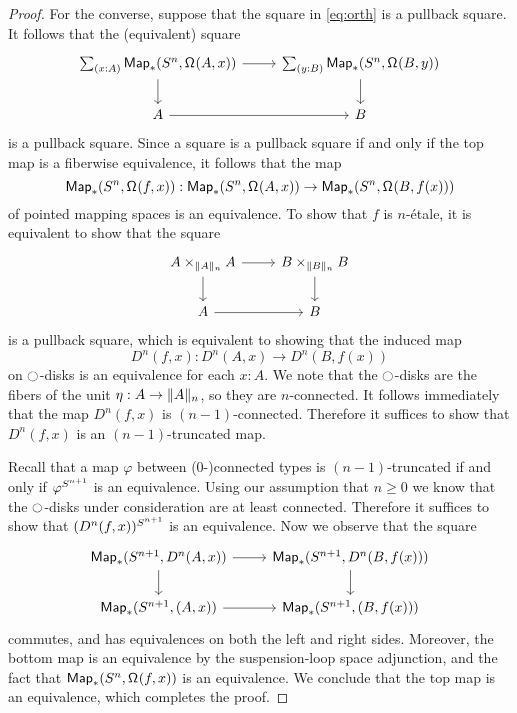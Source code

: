 \documentclass[9pt,twosided]{amsart}
\begin{document}
\begin{proof}
  For the converse, suppose that the square in \cref{eq:orth} is a pullback square. It follows that the (equivalent) square
  \begin{equation*}
    \begin{tikzcd}
      \sm{x:A}\mathsf{Map}_\ast(\sphere{n},\loopspace{A,x}) \arrow[r] \arrow[d] & \sm{y:B} \mathsf{Map}_\ast(\sphere{n},\loopspace{B,y}) \arrow[d] \\
      A \arrow[r] & B
    \end{tikzcd}
  \end{equation*}
is a pullback square.
  Since a square is a pullback square if and only if the top map is a fiberwise equivalence, it follows that the map
  \begin{equation*}
    \mathsf{Map}_\ast(S^{n},\mathsf{\Omega}^{}(f,x)):\mathsf{Map}_\ast(S^{n},\mathsf{\Omega}^{}(A,x)) \to \mathsf{Map}_\ast(S^{n},\mathsf{\Omega}^{}(B,f(x)))
  \end{equation*}
  of pointed mapping spaces is an equivalence. To show that $f$ is $n$-\'etale, it is equivalent to show that the square
  \begin{equation*}
    \begin{tikzcd}
      A\times_{\trunc{n}{A}} A \arrow[r] \arrow[d] & B \times_{\trunc{n}{B}} B \arrow[d] \\
      A \arrow[r] & B
    \end{tikzcd}
  \end{equation*}
  is a pullback square, which is equivalent to showing that the induced map
  \begin{equation*}
    D^{n}(f,x):D^{n}(A,x)\to D^{n}(B,f(x))
  \end{equation*}
  on ${\ocircle}$-disks is an equivalence for each $x:A$. We note that the ${\ocircle}$-disks are the fibers of the unit $\eta:A \to \trunc{n}{A}$, so they are $n$-connected. It follows immediately that the map $D^{n}(f,x)$ is $(n-1)$-connected. Therefore it suffices to show that $D^{n}(f,x)$ is an $(n-1)$-truncated map.

  Recall that a map $\varphi$ between ($0$-)connected types is $(n-1)$-truncated if and only if $\varphi^{S^{n+1}}$ is an equivalence. Using our assumption that $n\geq 0$ we know that the ${\ocircle}$-disks under consideration are at least connected. Therefore it suffices to show that $(D^{n}(f,x))^{S^{n+1}}$ is an equivalence. Now we observe that the square
  \begin{equation*}
    \begin{tikzcd}
      \mathsf{Map}_\ast(\sphere{n+1},D^{n}(A,x)) \arrow[r] \arrow[d] & \mathsf{Map}_\ast(\sphere{n+1},D^{n}(B,f(x))) \arrow[d] \\
      \mathsf{Map}_\ast(\sphere{n+1},(A,x)) \arrow[r] & \mathsf{Map}_\ast(\sphere{n+1},(B,f(x)))
    \end{tikzcd}
  \end{equation*}
  commutes, and has equivalences on both the left and right sides. Moreover, the bottom map is an equivalence by the suspension-loop space adjunction, and the fact that $\mathsf{Map}_\ast(S^{n},\mathsf{\Omega}^{}(f,x))$ is an equivalence. We conclude that the top map is an equivalence, which completes the proof.
\end{proof}
\end{document}
